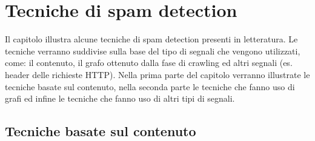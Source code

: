 \chapter{Tecniche di spam detection}
Il capitolo illustra alcune tecniche di spam detection presenti in letteratura. Le tecniche verranno suddivise sulla base del tipo di segnali che vengono utilizzati, come: il contenuto, il grafo ottenuto dalla fase di crawling ed altri segnali (es. header delle richieste HTTP). Nella prima parte del capitolo verranno illustrate le tecniche basate sul contenuto, nella seconda parte le tecniche che fanno uso di grafi ed infine le tecniche che fanno uso di altri tipi di segnali.

\section{Tecniche basate sul contenuto}
